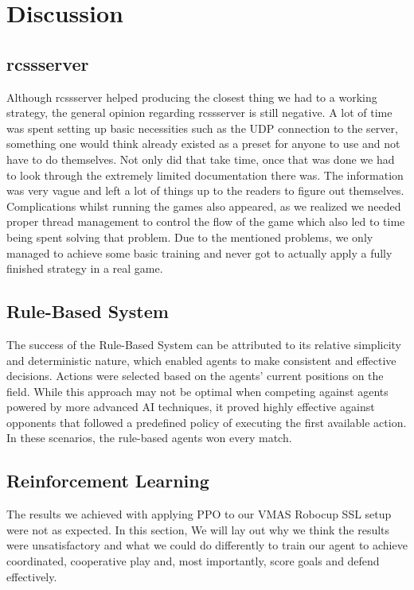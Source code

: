 \section{Discussion}
\label{section:disc}

\subsection{rcssserver}
Although rcssserver helped producing the closest thing we had to a working strategy, the general opinion regarding rcssserver is still negative. A lot of time was spent setting up basic necessities such as the UDP connection to the server, something one would think already existed as a preset for anyone to use and not have to do themselves. Not only did that take time, once that was done we had to look through the extremely limited documentation there was. The information was very vague and left a lot of things up to the readers to figure out themselves. Complications whilst running the games also appeared, as we realized we needed proper thread management to control the flow of the game which also led to time being spent solving that problem. Due to the mentioned problems, we only managed to achieve some basic training and never got to actually apply a fully finished strategy in a real game.

\subsection{Rule-Based System}
The success of the Rule-Based System can be attributed to its relative simplicity and deterministic nature, which enabled agents to make consistent and effective decisions. Actions were selected based on the agents’ current positions on the field. While this approach may not be optimal when competing against agents powered by more advanced AI techniques, it proved highly effective against opponents that followed a predefined policy of executing the first available action. In these scenarios, the rule-based agents won every match.

\subsection{Reinforcement Learning}
The results we achieved with applying PPO to our VMAS Robocup SSL setup were not as expected.
In this section, We will lay out why we think the results were unsatisfactory and what we could do differently to train our agent to achieve coordinated, cooperative play and, most importantly, score goals and defend effectively.

